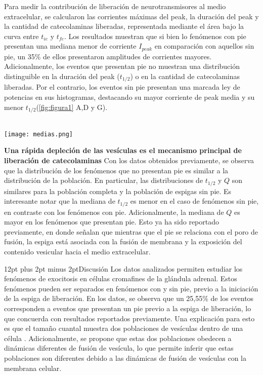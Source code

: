 \documentclass[twocolumn]{article}
\makeatletter
\def\section{\@startsection {section}{1}{\z@}{24pt plus 2pt minus 2pt}
{12pt plus 2pt minus 2pt}{\large\bf}}
\makeatother
\begin{document}
Para medir la contribución de liberación de neurotransmisores al medio extracelular, se calcularon las corrientes máximas del peak, la duración del peak y la cantidad de catecolaminas liberadas, representada mediante el área bajo la curva entre $t_{ie}$ y $t_{fe}$. Los resultados muestran que si bien lo fenómenos con pie presentan una mediana menor de corriente $I_{peak}$ en comparación con aquellos sin pie, un 35\% de ellos presentaron amplitudes de corrientes mayores.  Adicionalmente, los eventos que presentan pie no muestran una distribución distinguible en la duración del peak ($t_{1/2}$) o en la cantidad de catecolaminas liberadas.
Por el contrario, los eventos sin pie presentan una marcada ley de potencias en sus histogramas, destacando su mayor corriente de peak media y su menor $t_{1/2}$(\ref{fig:figura1} A,D y G).\\ \\
\begin{figure*}[h!]
\centering
\texttt{[image: medias.png]} 
\caption{Medianas de $I_{max}$, $Q$ y $t_{1/2}$ para los eventos totales(data) eventos con pie(foot) y eventos sin pie (no foot)}
\label{fig:medianas}
\end{figure*}


{\bf Una rápida depleción de las vesículas es el mecanismo principal de liberación de catecolaminas}
Con los datos obtenidos previamente, se observa que la distribución de los fenómenos que no presentan pie es similar a la distribución de la población. En particular, las distribuciones de $t_{1/2}$ y $Q$ son similares para la población completa y la población de espigas sin pie.  Es interesante notar que la mediana de $t_{1/2}$ es menor en el caso de fenómenos sin pie, en contraste con los fenómenos con pie.  Adicionalmente, la mediana de $Q$ es mayor en los fenómenos que presentan pie.  Esto ya ha sido reportado previamente\cite{amatore2009quantitative}, en donde señalan que mientras que el pie se relaciona con el poro de fusión, la espiga está asociada con la fusión de membrana y la exposición del contenido vesicular hacia el medio extracelular.

\section{Discusión}
Los datos analizados permiten estudiar los fenómenos de exocitosis en células cromafines de la glándula adrenal.  Estos fenómenos pueden ser separados en fenómenos con y sin pie, previo a la iniciación de la espiga de liberación\citep{amatore2005correlation}.  
En los datos, se observa que un 25,55\% de los eventos corresponden a eventos que presentan un pie previo a la espiga de liberación, lo que concuerda con resultados reportados previamente\citep{amatore2005correlation, amatore2009quantitative}.  
Una explicación para esto es que el tamaño cuantal muestra dos poblaciones de vesículas dentro de una célula	\citep{grabner2005mouse}.
Adicionalmente, se propone que estas dos poblaciones obedecen a dinámicas diferentes de fusión de vesícula, lo que permite inferir que estas poblaciones son diferentes debido a las dinámicas de fusión de vesículas con la membrana celular\citep{amatore2009quantitative, martens2008mechanisms}.
\end{document}
